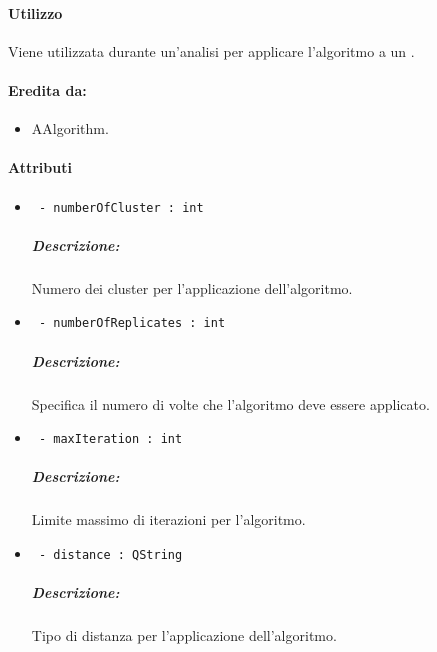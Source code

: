 \paragraph{Utilizzo\\} Viene utilizzata durante un'analisi per applicare l'algoritmo a un \dataset{}.

\paragraph{Eredita da:}
\begin{itemize}
	\item AAlgorithm.
\end{itemize}

\paragraph{Attributi\\}
	\begin{itemize}
		\item  \color{teal}\verb! - numberOfCluster : int !\\
		\color{black}
		\subparagraph{Descrizione:} Numero dei cluster per l'applicazione dell'algoritmo.
		\item  \color{teal}\verb! - numberOfReplicates : int !\\
		\color{black}
		\subparagraph{Descrizione:} Specifica il numero di volte che l'algoritmo deve essere applicato.
		\item  \color{teal}\verb! - maxIteration : int !\\
		\color{black}
		\subparagraph{Descrizione:} Limite massimo di iterazioni per l'algoritmo.
		\item  \color{teal}\verb! - distance : QString !\\
		\color{black}
		\subparagraph{Descrizione:} Tipo di distanza per l'applicazione dell'algoritmo.
	\end{itemize}
	
